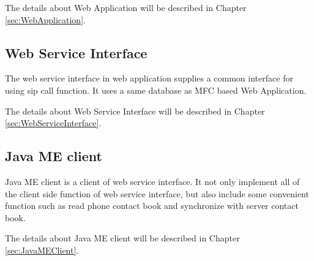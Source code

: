 The details about Web Application will be described in Chapter \ref{sec:WebApplication}.

\subsection{Web Service Interface}

The web service interface in web application supplies a common interface for using sip call function. It uses a same database as MFC based Web Application.

The details about Web Service Interface will be described in Chapter \ref{sec:WebServiceInterface}.

\subsection{Java ME client}

Java ME client is a client of web service interface. It not only implement all of the client side function of web service interface, but also include some convenient function such as read phone contact book and synchronize with server contact book.

The details about Java ME client will be described in Chapter \ref{sec:JavaMEClient}.







